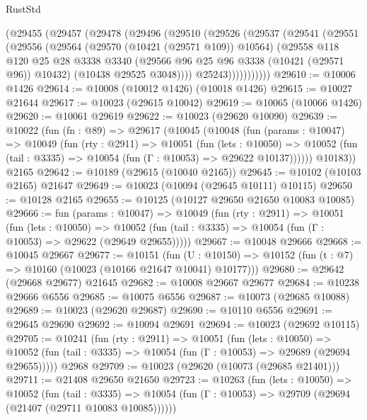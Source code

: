 \begin{lexlean}{RustStd}
\begin{coremodule}
        (@29455
          (@29457
            (@29478
              (@29496
                (@29510
                  (@29526
                    (@29537
                      (@29541
                        (@29551
                          (@29556
                            (@29564
                              (@29570 (@10421 (@29571 @109)) @10564)
                              (@29558
                                @118
                                @120
                                @25
                                @28
                                @3338
                                @3340
                                (@29566 @96 @25 @96 @3338 (@10421 (@29571 @96)) @10432)
                                (@10438 @29525 @3048))))
                          @25243)))))))))))
@29610 := @10006 @1426
@29614 := @10008 (@10012 @1426) (@10018 @1426)
@29615 := @10027 @21644
@29617 := @10023 (@29615 @10042)
@29619 := @10065 (@10066 @1426)
@29620 := @10061 @29619
@29622 := @10023 (@29620 @10090)
@29639 := @10022
    (fun (fn : @89) =>
    @29617
      (@10045
        (@10048
          (fun (params : @10047) =>
          @10049
            (fun (rty : @2911) =>
            @10051
              (fun (lets : @10050) =>
              @10052 (fun (tail : @3335) => @10054 (fun (Γ : @10053) => @29622 @10137))))))
        @10183))
    @2165
@29642 := @10189 (@29615 (@10040 @2165))
@29645 := @10102 (@10103 @2165) @21647
@29649 := @10023 (@10094 (@29645 @10111) @10115)
@29650 := @10128 @2165
@29655 := @10125 (@10127 @29650 @21650 @10083 @10085)
@29666 := fun (params : @10047) =>
  @10049
    (fun (rty : @2911) =>
    @10051
      (fun (lets : @10050) =>
      @10052 (fun (tail : @3335) => @10054 (fun (Γ : @10053) => @29622 (@29649 @29655)))))
@29667 := @10048 @29666
@29668 := @10045 @29667
@29677 := @10151
    (fun (U : @10150) => @10152 (fun (t : @7) => @10160 (@10023 (@10166 @21647 @10041) @10177)))
@29680 := @29642 (@29668 @29677) @21645
@29682 := @10008 @29667 @29677
@29684 := @10238 @29666 @6556
@29685 := @10075 @6556
@29687 := @10073 (@29685 @10088)
@29689 := @10023 (@29620 @29687)
@29690 := @10110 @6556
@29691 := @29645 @29690
@29692 := @10094 @29691
@29694 := @10023 (@29692 @10115)
@29705 := @10241
    (fun (rty : @2911) =>
    @10051
      (fun (lets : @10050) =>
      @10052 (fun (tail : @3335) => @10054 (fun (Γ : @10053) => @29689 (@29694 @29655)))))
    @2968
@29709 := @10023 (@29620 (@10073 (@29685 @21401)))
@29711 := @21408 @29650 @21650
@29723 := @10263
    (fun (lets : @10050) =>
    @10052
      (fun (tail : @3335) =>
      @10054 (fun (Γ : @10053) => @29709 (@29694 (@21407 (@29711 @10083 @10085))))))

\end{coremodule}
\end{lexlean}
